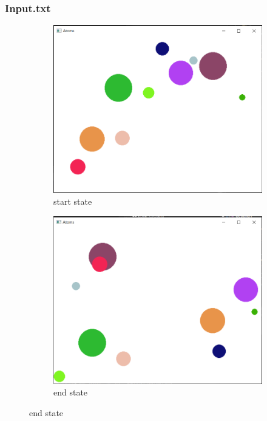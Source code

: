 \documentclass[11pt,titlepage]{article}
\begin{document}
			\subsubsection{Input.txt}
				\begin{figure}[h!]
					\centering
					\begin{subfigure}{.5\textwidth}
						\centering
						\includegraphics[scale=0.5]{pictures/input_nocollision.png}
						\caption{start state}
						\label{fig:sub1}
					\end{subfigure}%
					\begin{subfigure}{.5\textwidth}
						\centering
						\includegraphics[scale=0.5]{pictures/input_nocollision_final.png}
						\caption{end state}
						\label{fig:sub2}
					\end{subfigure}
				\end{figure}
\end{document}
